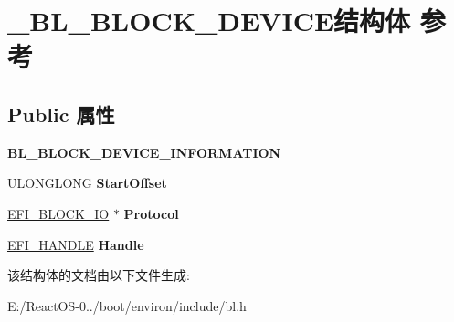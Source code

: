 \hypertarget{struct___b_l___b_l_o_c_k___d_e_v_i_c_e}{}\section{\+\_\+\+B\+L\+\_\+\+B\+L\+O\+C\+K\+\_\+\+D\+E\+V\+I\+C\+E结构体 参考}
\label{struct___b_l___b_l_o_c_k___d_e_v_i_c_e}
\subsection*{Public 属性}
\begin{DoxyCompactItemize}
\item 
\mbox{\label{struct___b_l___b_l_o_c_k___d_e_v_i_c_e_a0ece52ea3dd6936670dfdb29bb5f5017}} 
{\bfseries B\+L\+\_\+\+B\+L\+O\+C\+K\+\_\+\+D\+E\+V\+I\+C\+E\+\_\+\+I\+N\+F\+O\+R\+M\+A\+T\+I\+ON}
\item 
\mbox{\label{struct___b_l___b_l_o_c_k___d_e_v_i_c_e_a3c488b457bd06e2b1537142fe5769fea}} 
U\+L\+O\+N\+G\+L\+O\+NG {\bfseries Start\+Offset}
\item 
\mbox{\label{struct___b_l___b_l_o_c_k___d_e_v_i_c_e_a2c9f8937fa04f8e8e862078b5ba61ba8}} 
\hyperlink{_block_io_8h_a0b1d66f1cd207006df62ab9f1073fae8}{E\+F\+I\+\_\+\+B\+L\+O\+C\+K\+\_\+\+IO} $\ast$ {\bfseries Protocol}
\item 
\mbox{\label{struct___b_l___b_l_o_c_k___d_e_v_i_c_e_a9fc58bdc84c5008be336f2d97b44ee4f}} 
\hyperlink{_uefi_base_type_8h_af943d518ce8a229e7e51ce3fed0e3122}{E\+F\+I\+\_\+\+H\+A\+N\+D\+LE} {\bfseries Handle}
\end{DoxyCompactItemize}


该结构体的文档由以下文件生成\+:\begin{DoxyCompactItemize}
\item 
E\+:/\+React\+O\+S-\/0../boot/environ/include/bl.\+h\end{DoxyCompactItemize}
